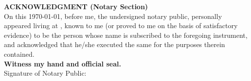 
\textbf{ACKNOWLEDGMENT (Notary Section)}
\\

On this \today{}, before me, the undersigned notary public, personally appeared \PrincipalName{} living at \PrincipalAddress{}, known to me (or proved to me on the basis of satisfactory evidence) to be the person whose name is subscribed to the foregoing instrument, and acknowledged that he/she executed the same for the purposes therein contained.
\\

\textbf{Witness my hand and official seal.}
\\

Signature of Notary Public: 


